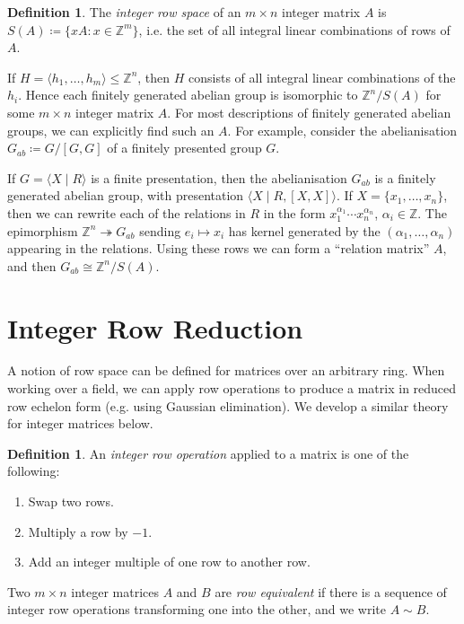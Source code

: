 \documentclass[12pt,a4paper]{article}
\newcommand{\Z}{\mathbb{Z}}
\theoremstyle{definition}
\newtheorem{definition}[theorem]{Definition}
\begin{document}
\begin{definition}
  The \emph{integer row space} of an $m\times n$ integer matrix $A$ is $S(A)\coloneqq\{xA : x\in\Z^m\}$, i.e. the set of all integral linear combinations of rows of $A$.
\end{definition}

If $H=\langle h_1,\ldots,h_m \rangle\leq\Z^n$, then $H$ consists of all integral linear combinations of the $h_i$. Hence each finitely generated abelian group is isomorphic to $\Z^n/S(A)$ for some $m\times n$ integer matrix $A$. For most descriptions of finitely generated abelian groups, we can explicitly find such an $A$. For example, consider the abelianisation $G_{ab}\coloneqq G/[G,G]$ of a finitely presented group $G$.

If $G=\langle X \mid R \rangle$ is a finite presentation, then the abelianisation $G_{ab}$ is a finitely generated abelian group, with presentation $\langle X \mid R, [X,X] \rangle$. If $X=\{x_1,\ldots,x_n\}$, then we can rewrite each of the relations in $R$ in the form $x_1^{\alpha_1}\cdots x_n^{\alpha_n}$, $\alpha_i\in\Z$. The epimorphism $\Z^n\twoheadrightarrow G_{ab}$ sending $e_i\mapsto x_i$ has kernel generated by the $(\alpha_1,\ldots,\alpha_n)$ appearing in the relations. Using these rows we can form a ``relation matrix'' $A$, and then $G_{ab}\cong\Z^n/S(A)$.

\section{Integer Row Reduction}

A notion of row space can be defined for matrices over an arbitrary ring. When working over a field, we can apply row operations to produce a matrix in reduced row echelon form (e.g. using Gaussian elimination). We develop a similar theory for integer matrices below.

\begin{definition}
  An \emph{integer row operation} applied to a matrix is one of the following:
  \begin{enumerate}
  \item Swap two rows.
  \item Multiply a row by $-1$.
  \item Add an integer multiple of one row to another row.
  \end{enumerate}
  Two $m\times n$ integer matrices $A$ and $B$ are \emph{row equivalent} if there is a sequence of integer row operations transforming one into the other, and we write $A\sim B$.
\end{definition}
\end{document}

